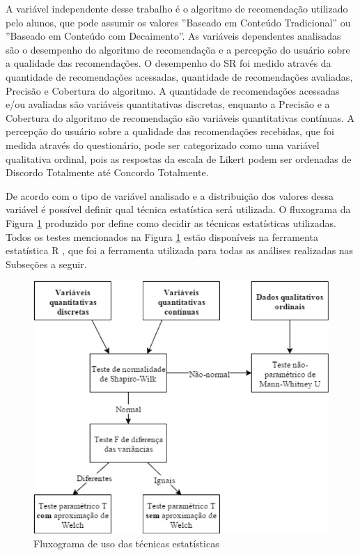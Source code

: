 A variável independente desse trabalho é o algoritmo de recomendação utilizado pelo alunos, que pode assumir os valores
''Baseado em Conteúdo Tradicional'' ou ''Baseado em Conteúdo com Decaimento''. As variáveis dependentes analisadas são o
desempenho do algoritmo de recomendaçõa e a percepção do usuário sobre a qualidade das recomendações. O desempenho do SR
foi medido através da quantidade de recomendações acessadas, quantidade de recomendações avaliadas, Precisão e Cobertura do
algoritmo. A quantidade de recomendações acessadas e/ou avaliadas são variáveis quantitativas discretas,
enquanto a Precisão e a Cobertura do algoritmo de recomendação são variáveis quantitativas contínuas. A percepção do usuário sobre
a qualidade das recomendações recebidas, que foi medida através do questionário, pode ser categorizado como uma variável
qualitativa ordinal, pois as respostas da escala de Likert podem ser ordenadas de Discordo Totalmente até Concordo Totalmente.

De acordo com o tipo de variável analisado e a distribuição dos valores dessa variável é possível definir qual técnica
estatística será utilizada. O fluxograma da Figura \ref{fig:fluxograma-tecnica-moissa} produzido por 
define como decidir as técnicas estatísticas utilizadas. Todos os testes mencionados na Figura \ref{fig:fluxograma-tecnica-moissa}
estão disponíveis na ferramenta estatística R \cite{rstatisticalcomputing2018}, que foi a ferramenta utilizada para todas as análises realizadas nas
Subseções a seguir.

\begin{figure}[htb]
  \caption{\label{fig:fluxograma-tecnica-moissa}Fluxograma de uso das técnicas estatísticas}
  \begin{center}
      \includegraphics[scale=1.0]{./Figuras/fluxograma-tecnicas-moissa.png}
  \end{center}
\end{figure}

